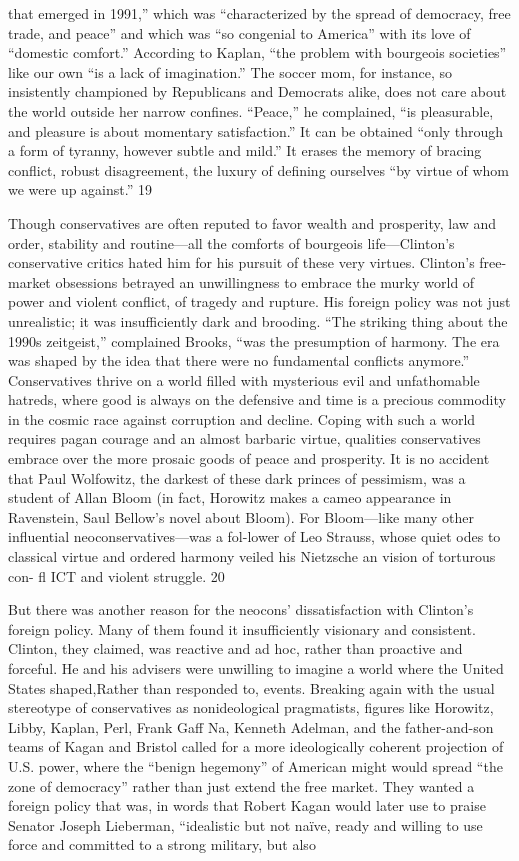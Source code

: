 that emerged in 1991,” which was “characterized by the spread of democracy, free trade, and peace” and which was “so congenial to America” with its love of “domestic comfort.” According to Kaplan, “the problem with bourgeois societies” like our own “is a lack of imagination.” The soccer mom, for instance, so insistently championed by Republicans and Democrats alike, does not care about the world outside her narrow confines. “Peace,” he complained, “is pleasurable, and pleasure is about momentary satisfaction.” It can be obtained “only through a form of tyranny, however subtle and mild.” It erases the memory of bracing conflict, robust disagreement, the luxury of defining ourselves “by virtue of whom we were up against.” {\color{blue} 19 } {\par} Though conservatives are often reputed to favor wealth and prosperity, law and order, stability and routine—all the comforts of bourgeois life—Clinton’s conservative critics hated him for his pursuit of these very virtues. Clinton’s free-market obsessions betrayed an unwillingness to embrace the murky world of power and violent conflict, of tragedy and rupture. His foreign policy was not just unrealistic; it was insufficiently dark and brooding. “The striking thing about the 1990s zeitgeist,” complained Brooks, “was the presumption of harmony. The era was shaped by the idea that there were no fundamental conflicts anymore.” Conservatives thrive on a world filled with mysterious evil and unfathomable hatreds, where good is always on the defensive and time is a precious commodity in the cosmic race against corruption and decline. Coping with such a world requires pagan courage and an almost barbaric virtue, qualities conservatives embrace over the more prosaic goods of peace and prosperity. It is no accident that Paul Wolfowitz, the darkest of these dark princes of pessimism, was a student of Allan Bloom (in fact, Horowitz makes a cameo appearance in Ravenstein, Saul Bellow’s novel about Bloom). For Bloom—like many other influential neoconservatives—was a fol-lower of Leo Strauss, whose quiet odes to classical virtue and ordered harmony veiled his Nietzsche an vision of torturous con- fl ICT and violent struggle. {\color{blue} 20 } {\par} But there was another reason for the neocons’ dissatisfaction with Clinton’s foreign policy. Many of them found it insufficiently visionary and consistent. Clinton, they claimed, was reactive and ad hoc, rather than proactive and forceful. He and his advisers were unwilling to imagine a world where the United States shaped,Rather than responded to, events. Breaking again with the usual stereotype of conservatives as nonideological pragmatists, figures like Horowitz, Libby, Kaplan, Perl, Frank Gaff Na, Kenneth Adelman, and the father-and-son teams of Kagan and Bristol called for a more ideologically coherent projection of U.S. power, where the “benign hegemony” of American might would spread “the zone of democracy” rather than just extend the free market. They wanted a foreign policy that was, in words that Robert Kagan would later use to praise Senator Joseph Lieberman, “idealistic but not naïve, ready and willing to use force and committed to a strong military, but also 